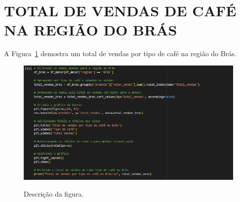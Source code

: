 \section{TOTAL DE VENDAS DE CAFÉ NA REGIÃO DO BRÁS  }
	\label{sec:identificao}
\label{sec:figura}
A Figura~\ref{figuras/configuraçao-mais-vendido-Bras.png} demostra um total de vendas por tipo de café na região do Brás.
\begin{figure}[!ht]
	{\centering
		\caption{Descrição da figura.}
		\includegraphics[width=1.0\textwidth]{figuras/configuraçao-mais-vendido-Bras.png}
		\label{figuras/configuraçao-mais-vendido-Bras.png}
	}
\end{figure} \\ \\ \\ \\ \\ \\ \\  \\ \\ \\ \\ \\ 

